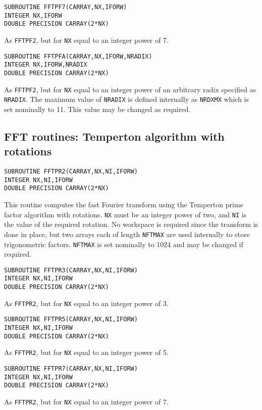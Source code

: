 \documentclass[dvips]{article}
\begin{document}
\begin{verbatim}
SUBROUTINE FFTPF7(CARRAY,NX,IFORW)
INTEGER NX,IFORW
DOUBLE PRECISION CARRAY(2*NX)
\end{verbatim}
As {\tt FFTPF2}, but for {\tt NX} equal to an integer power of 7.\\

\begin{verbatim}
SUBROUTINE FFTPFA(CARRAY,NX,IFORW,NRADIX)
INTEGER NX,IFORW,NRADIX
DOUBLE PRECISION CARRAY(2*NX)
\end{verbatim}
As {\tt FFTPF2}, but for {\tt NX} equal to an integer power of an
arbitrary radix specified as {\tt NRADIX}.  The maximum
value of {\tt NRADIX} is defined internally as {\tt NRDXMX} which is set
nominally to 11.  This value may be changed as required.

\subsection*{FFT routines: Temperton algorithm with rotations}
\begin{verbatim}
SUBROUTINE FFTPR2(CARRAY,NX,NI,IFORW)
INTEGER NX,NI,IFORW
DOUBLE PRECISION CARRAY(2*NX)
\end{verbatim}
This routine computes the fast Fourier transform using the Temperton
prime factor algorithm with rotations.
{\tt NX} must be an integer power of two, and {\tt NI} is the
value of the required rotation.  No workspace
is required since the transform is done in place, but two arrays each of
length {\tt NFTMAX} are used internally to store trigonometric factors.
{\tt NFTMAX} is set nominally to 1024 and may be changed if required.

\begin{verbatim}
SUBROUTINE FFTPR3(CARRAY,NX,NI,IFORW)
INTEGER NX,NI,IFORW
DOUBLE PRECISION CARRAY(2*NX)
\end{verbatim}
As {\tt FFTPR2}, but for {\tt NX} equal to an integer power of 3.\\

\begin{verbatim}
SUBROUTINE FFTPR5(CARRAY,NX,NI,IFORW)
INTEGER NX,NI,IFORW
DOUBLE PRECISION CARRAY(2*NX)
\end{verbatim}
As {\tt FFTPR2}, but for {\tt NX} equal to an integer power of 5.\\

\begin{verbatim}
SUBROUTINE FFTPR7(CARRAY,NX,NI,IFORW)
INTEGER NX,NI,IFORW
DOUBLE PRECISION CARRAY(2*NX)
\end{verbatim}
As {\tt FFTPR2}, but for {\tt NX} equal to an integer power of 7.\\
\end{document}
